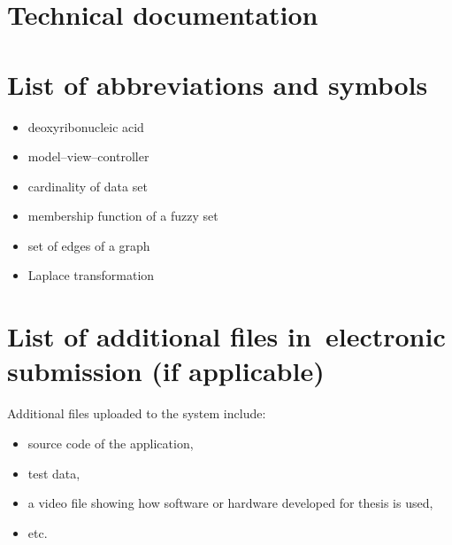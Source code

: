 \documentclass[a4paper,twoside,12pt]{book}
\begin{document}
\backmatter

\cleardoublepage
{}
\printbibliography           %

\begin{appendices}

\chapter{Technical documentation}


\chapter{List of abbreviations and symbols}

\begin{itemize}
\item[DNA] deoxyribonucleic acid
\item[MVC] model--view--controller 
\item[$N$] cardinality of data set
\item[$\mu$] membership function of a fuzzy set
\item[$\mathbb{E}$] set of edges of a graph
\item[$\mathcal{L}$] Laplace transformation
\end{itemize}

\chapter{List of additional files in~electronic submission (if applicable)}

Additional files uploaded to the system include:
\begin{itemize}
\item source code of the application,
\item test data,
\item a video file showing how software or hardware developed for thesis is used,
\item etc.
\end{itemize}



\listoffigures
{}
\listoftables
{}

\end{appendices}
\end{document}
